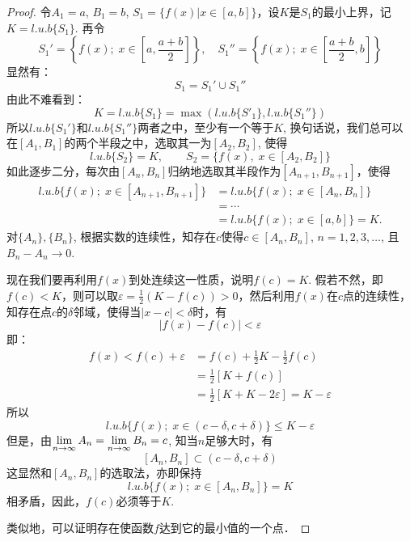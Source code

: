 \begin{proof}
令$A_1=a$, $B_1=b$, $S_1=\{f(x)|x\in [a,b]\}$，设$K$是$S_1$的最小上界，记$K=l.u.b\{S_1\}$. 再令
\[S_1'=\left\{f (x) ; \; x\in \left[a,\frac{a+b}{2}\right]\right\},\quad S_1''=\left\{f(x);\; x\in\left[\frac{a+b}{2},b\right]\right\}\]
显然有：
\[S_1=S_1'\cup S_1''\]
由此不难看到：
\[K=l.u.b \{S_1\} =\max \left(l.u.b \{S'_1\} ,l.u.b\{S_1''\}\right)\]
所以$l.u.b\{S_1'\}$和$l.u.b\{S_1''\}$两者之中，至少有一个等于$K$, 换句话说，我们总可以在$[A_1,B_1]$的两个半段之中，选取其一为$[A_2,B_2]$, 使得
\[l.u.b \{S_2\} =K,\qquad  S_2= \{f (x) ,\; x\in [A_2, B_2] \}\] 
如此逐步二分，每次由$[A_{n} ,B_{n}]$归纳地选取其半段作为$[A_{n+1} ,B_{n+1}]$，使得
\[\begin{split}
    l.u.b \{f (x) ;\; x\in  [A_{n+1}, B_{n+1}] \}&=l.u.b \{f (x) ;\; x\in [A_n, B_n] \}\\
&=\cdots\\
&=l.u.b \{f (x) ;\; x\in  [a,b] \}=K.
\end{split}\]
对$\{A_n\},\{B_n \}$, 根据实数的连续性，知存在$c$使得$c\in [A_n,B_n]$, $n=1, 2, 3,\ldots$, 且$B_n-A_n\to 0$.

现在我们要再利用$f(x)$到处连续这一性质，说明$f(c)=K$. 假若不然，即$f(c)<K$，则可以取$\varepsilon=\frac{1}{2}(K-f(c))>0$，然后利用$f(x)$在$c$点的连续性，知存在点$c$的$\delta$邻域，使得当$|x-c|<\delta$时，有
\[|f(x)-f(c)|<\varepsilon\]
即：
\[\begin{split}
    f(x)<f(c)+\varepsilon&=f(c)+\frac{1}{2}K-\frac{1}{2}f(c)\\
    &=\frac{1}{2}[K+f(c)]\\
    &=\frac{1}{2}[K+K-2\varepsilon]=K-\varepsilon
\end{split}\]
所以
\[l.u.b \{f (x) ;\; x\in  (c-\delta,c+\delta) \} \le K-\varepsilon\]
但是，由$\displaystyle\lim_{n\to\infty} A_n=\displaystyle\lim_{n\to\infty}B_n=c$, 知当$n$足够大时，有
\[[A_n,B_n]\subset (c-\delta,c+\delta)\]
这显然和$[A_n,B_n]$的选取法，亦即保持
\[l.u.b \{f (x) ;\; x\in [A_n,B_n]\}=K\]
相矛盾，因此，$f(c)$必须等于$K$. 

类似地，可以证明存在使函数$f$达到它的最小值的一个点．
\end{proof}

